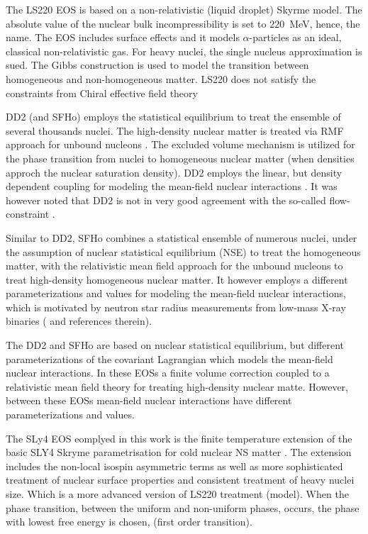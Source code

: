 \documentclass[11pt,a4paper,headinclude=true,DIV=14,BCOR=8mm,chapterprefix,listof=totoc,twoside,openright,abstracton]{scrbook}
\begin{document}
The LS220 EOS is based on a non-relativistic (liquid droplet) Skyrme model.
The absolute value of the nuclear bulk incompressibility is set to $220$~MeV, hence, the name.
The EOS includes surface effects and it models $\alpha$-particles as an ideal, classical
non-relativistic gas. For heavy nuclei, the single nucleus approximation is sued. 
The Gibbs construction is used to model the transition between homogeneous and non-homogeneous matter.
LS220 does not satisfy the constraints from Chiral effective field theory \cite{Hempel:2017ikt}

DD2 (and SFHo) employs the statistical equilibrium to treat the ensemble of several thousands nuclei.
The high-density nuclear matter is treated via RMF approach for unbound nucleons \cite{Hempel:2009mc}.
The excluded volume mechanism is utilized for the phase transition from nuclei to homogeneous
nuclear matter (when densities approch the nuclear saturation density).
DD2 employs the linear, but density dependent coupling for modeling the mean-field nuclear interactions \cite{Typel:2009sy}.
It was however noted that DD2 is not in very good agreement with the so-called flow-constraint \cite{Danielewicz:2002pu}.

Similar to DD2, SFHo combines a statistical ensemble of numerous nuclei, under the assumption of nuclear
statistical equilibrium (NSE) to treat the homogeneous matter, 
with the relativistic mean field approach for the unbound nucleons to treat high-density homogeneous nuclear matter.
It however employs a different parameterizations and values for modeling the mean-field nuclear interactions, 
which is motivated by neutron star radius measurements from low-mass X-ray
binaries (\cite{Steiner:2012rk} and references therein).

The DD2 and SFHo are based on nuclear statistical equilibrium, but 
different parameterizations of the covariant Lagrangian which models the mean-field nuclear interactions.
In these EOSs a finite volume correction coupled to a relativistic mean field theory for treating high-density nuclear matte. However, between these EOSs mean-field nuclear interactions have different parameterizations and values.

The SLy4 EOS eomplyed in this work is the finite temperature extension \cite{daSilvaSchneider:2017jpg}
of the basic SLY4 Skryme parametrisation for cold nuclear NS matter \cite{Douchin:2001sv}.
The extension includes the non-local isospin asymmetric terms as well as more sophisticated 
treatment of nuclear surface properties and consistent treatment of heavy nuclei size. 
Which is a more advanced version of LS220 treatment (model).
When the phase transition, between the uniform and non-uniform phases, occurs, the phase with lowest 
free energy is chosen, (first order transition).
\end{document}
